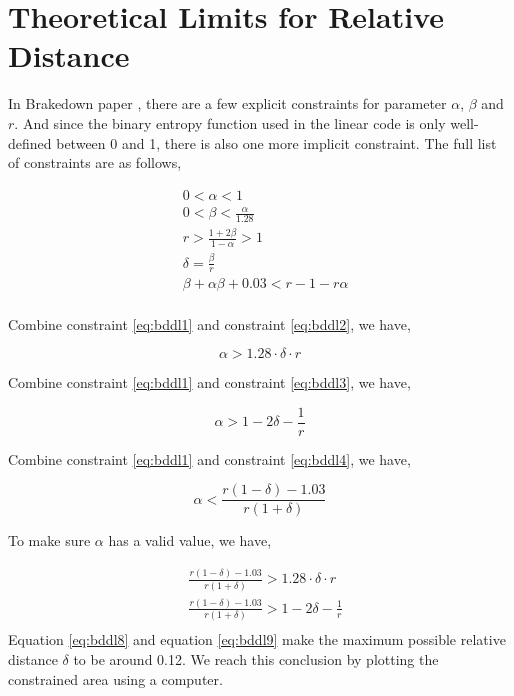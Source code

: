 \section{Theoretical Limits for Relative Distance}

In Brakedown paper \cite{brakedown}, there are a few explicit constraints for parameter $\alpha$, $\beta$ and $r$. And since the binary entropy function used in the linear code is only well-defined between 0 and 1, there is also one more implicit constraint. The full list of constraints are as follows,

\begin{align}
& 0 < \alpha < 1 \nonumber \\
& 0 < \beta < \frac{\alpha}{1.28} \label{eq:bddl2} \\
& r > \frac{1 + 2\beta}{1 - \alpha} > 1 \label{eq:bddl3} \\
& \delta = \frac{\beta}{r} \label{eq:bddl1} \\
& \beta + \alpha\beta + 0.03 < r - 1 - r\alpha \label{eq:bddl4} \\
\end{align}

Combine constraint \ref{eq:bddl1} and constraint \ref{eq:bddl2}, we have,

\begin{equation}
\label{eq:bddl5}
    \alpha > 1.28 \cdot \delta \cdot r 
\end{equation}
    

Combine constraint \ref{eq:bddl1} and constraint \ref{eq:bddl3}, we have,

\begin{equation}
\label{eq:bddl6}
    \alpha > 1 - 2\delta - \frac{1}{r} 
\end{equation}


Combine constraint \ref{eq:bddl1} and constraint \ref{eq:bddl4}, we have,

\begin{equation}
\label{eq:bddl7}
    \alpha < \frac{r(1 - \delta) - 1.03}{r(1 + \delta)}
\end{equation}

To make sure $\alpha$ has a valid value, we have,

\begin{align}
& \frac{r(1 - \delta) - 1.03}{r(1 + \delta)} > 1.28 \cdot \delta \cdot r \label{eq:bddl8} \\
& \frac{r(1 - \delta) - 1.03}{r(1 + \delta)} > 1 - 2\delta - \frac{1}{r}  \label{eq:bddl9} \\
\end{align}
Equation \ref{eq:bddl8} and equation \ref{eq:bddl9} make the maximum possible relative distance $\delta$ to be around 0.12. We reach this conclusion by plotting the constrained area using a computer.